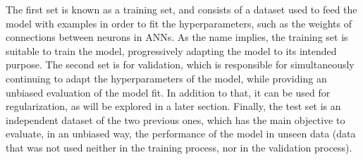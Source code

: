 The first set is known as a training set, and consists of a dataset used to feed the model with examples in order to fit the hyperparameters, such as the weights of connections between neurons in \ac{ANNs}. As the name implies, the training set is suitable to train the model, progressively adapting the model to its intended purpose. The second set is for validation, which is responsible for simultaneously continuing to adapt the hyperparameters of the model, while providing an unbiased evaluation of the model fit. In addition to that, it can be used for regularization, as will be explored in a later section. Finally, the test set is an independent dataset of the two previous ones, which has the main objective to evaluate, in an unbiased way, the performance of the model in unseen data (data that was not used neither in the training process, nor in the validation process). 

